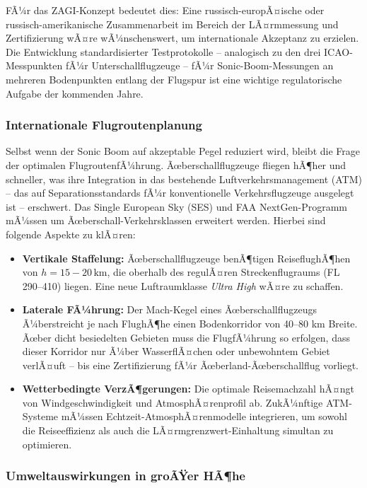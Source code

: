 ﻿\documentclass[12pt,a4paper]{article}
\theoremstyle{definition}
\theoremstyle{remark}
\begin{document}
FÃ¼r das ZAGI-Konzept bedeutet dies: Eine russisch-europÃ¤ische oder russisch-amerika\-nische
Zusammenarbeit im Bereich der LÃ¤rmmessung und Zertifizierung wÃ¤re wÃ¼nschenswert,
um internationale Akzeptanz zu erzielen. Die Entwicklung standardisierter Testprotokolle
-- analogisch zu den drei ICAO-Messpunkten fÃ¼r Unterschallflugzeuge -- fÃ¼r Sonic-Boom-Messungen
an mehreren Bodenpunkten entlang der Flugspur ist eine wichtige regulatorische Aufgabe
der kommenden Jahre.

\subsubsection{Internationale Flugroutenplanung}

Selbst wenn der Sonic Boom auf akzeptable Pegel reduziert wird, bleibt die
Frage der optimalen FlugroutenfÃ¼hrung. Ãœberschallflugzeuge fliegen hÃ¶her und schneller,
was ihre Integration in das bestehende Luftverkehrsmanagement (ATM) -- das auf
Separationsstandards fÃ¼r konventionelle Verkehrsflugzeuge ausgelegt ist -- erschwert.
Das Single European Sky (SES) und FAA NextGen-Programm mÃ¼ssen um
Ãœberschall-Verkehrsklassen erweitert werden. Hierbei sind folgende Aspekte zu klÃ¤ren:

\begin{itemize}
  \item \textbf{Vertikale Staffelung:} Ãœberschallflugzeuge benÃ¶tigen ReiseflughÃ¶hen von
        $h = 15{-}20\,\text{km}$, die oberhalb des regulÃ¤ren Streckenflugraums
        (FL 290--410) liegen. Eine neue Luftraumklasse \emph{Ultra High} wÃ¤re zu schaffen.
  \item \textbf{Laterale FÃ¼hrung:} Der Mach-Kegel eines Ãœberschallflugzeugs Ã¼berstreicht
        je nach FlughÃ¶he einen Bodenkorridor von 40--80 km Breite. Ãœber dicht besiedelten
        Gebieten muss die FlugfÃ¼hrung so erfolgen, dass dieser Korridor nur Ã¼ber WasserflÃ¤chen
        oder unbewohntem Gebiet verlÃ¤uft -- bis eine Zertifizierung fÃ¼r Ãœberland-Ãœberschallflug
        vorliegt.
  \item \textbf{Wetterbedingte VerzÃ¶gerungen:} Die optimale Reisemachzahl hÃ¤ngt von
        Windgeschwindigkeit und AtmosphÃ¤renprofil ab. ZukÃ¼nftige ATM-Systeme mÃ¼ssen
        Echtzeit-AtmosphÃ¤renmodelle integrieren, um sowohl die Reiseeffizienz als auch
        die LÃ¤rmgrenz\-wert-Einhaltung simultan zu optimieren.
\end{itemize}

\subsubsection{Umweltauswirkungen in groÃŸer HÃ¶he}
\end{document}
